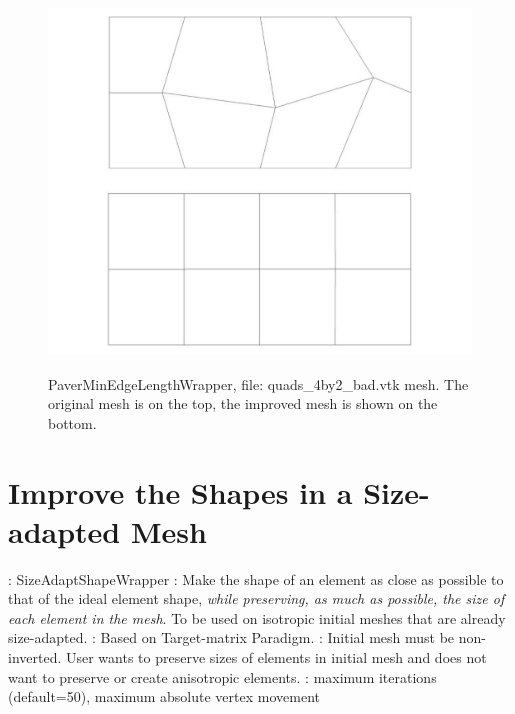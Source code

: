 \begin{figure}[htbp]
\begin{center}
    \includegraphics[height=100mm]{figures/min-edge-length}
    \caption{PaverMinEdgeLengthWrapper, file: quads\_4by2\_bad.vtk mesh. The original mesh is on the top, the improved mesh is shown on the bottom.}
    \label{fig:min_edge-length}
\end{center}
\end{figure}

\newpage

\section{Improve the Shapes in a Size-adapted Mesh} \label{sec:SizeAdaptShapeWrapper}

: SizeAdaptShapeWrapper \newline
{}: Make the shape of an element as close as possible to that
of the ideal element shape, {\it while preserving, as much as possible, the size of each element in the mesh}. To be used on isotropic initial meshes that are already size-adapted. \newline
{}: Based on Target-matrix Paradigm. \newline
{}: Initial mesh must be non-inverted.
User wants to preserve sizes of elements in initial mesh and does not want to preserve or
create anisotropic elements.  \newline
{}: maximum iterations (default=50), maximum absolute vertex movement \newline \newline

